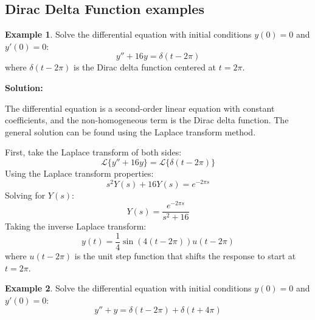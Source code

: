\documentclass{article}
\theoremstyle{definition}
\newtheorem{example}{Example}[section]
\begin{document}
\subsection{Dirac Delta Function examples}
\begin{example}
    Solve the differential equation with initial conditions \( y(0) = 0 \) and \( y'(0) = 0 \):
    \[
    y'' + 16y = \delta(t - 2\pi)
    \]
    where \(\delta(t - 2\pi)\) is the Dirac delta function centered at \( t = 2\pi \).

    \textbf{Solution:}

    The differential equation is a second-order linear equation with constant coefficients, and the non-homogeneous term is the Dirac delta function. The general solution can be found using the Laplace transform method. 

    First, take the Laplace transform of both sides:
    \[
    \mathcal{L}\{y'' + 16y\} = \mathcal{L}\{\delta(t - 2\pi)\}
    \]
    Using the Laplace transform properties:
    \[
    s^2Y(s) + 16Y(s) = e^{-2\pi s}
    \]
    Solving for \( Y(s) \):
    \[
    Y(s) = \frac{e^{-2\pi s}}{s^2 + 16}
    \]
    Taking the inverse Laplace transform:
    \[
    y(t) = \frac{1}{4}\sin(4(t - 2\pi))u(t - 2\pi)
    \]
    where \( u(t - 2\pi) \) is the unit step function that shifts the response to start at \( t = 2\pi \).
\end{example}
\begin{example}
    Solve the differential equation with initial conditions \( y(0) = 0 \) and \( y'(0) = 0 \):
    \[
    y'' + y = \delta(t - 2\pi) + \delta(t + 4\pi)
    \]
    
\end{example}
\end{document}
